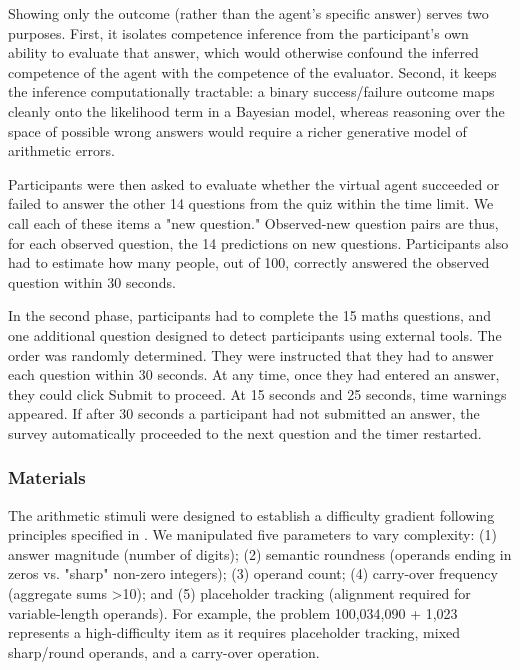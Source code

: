 \documentclass[10pt,letterpaper]{article}
\begin{document}
Showing only the outcome (rather than the agent's specific answer) serves two purposes. First, it isolates competence inference from the participant's own ability to evaluate that answer, which would otherwise confound the inferred competence of the agent with the competence of the evaluator. Second, it keeps the inference computationally tractable: a binary success/failure outcome maps cleanly onto the likelihood term in a Bayesian model, whereas reasoning over the space of possible wrong answers would require a richer generative model of arithmetic errors.

Participants were then asked to evaluate whether the virtual agent succeeded or failed to answer the other 14 questions from the quiz within the time limit. We call each of these items a "new question." Observed-new question pairs are thus, for each observed question, the 14 predictions on new questions. Participants also had to estimate how many people, out of 100, correctly answered the observed question within 30 seconds.

In the second phase, participants had to complete the 15 maths questions, and one additional question designed to detect participants using external tools. The order was randomly determined. They were instructed that they had to answer each question within 30 seconds. At any time, once they had entered an answer, they could click Submit to proceed. At 15 seconds and 25 seconds, time warnings appeared. If after 30 seconds a participant had not submitted an answer, the survey automatically proceeded to the next question and the timer restarted.

\subsubsection{Materials}\label{materials}

The arithmetic stimuli were designed to establish a difficulty gradient following principles specified in \citet{Dehaene-2011}. We manipulated five parameters to vary complexity: (1) answer magnitude (number of digits); (2) semantic roundness (operands ending in zeros vs. "sharp" non-zero integers); (3) operand count; (4) carry-over frequency (aggregate sums >10); and (5) placeholder tracking (alignment required for variable-length operands). For example, the problem 100,034,090 + 1,023 represents a high-difficulty item as it requires placeholder tracking, mixed sharp/round operands, and a carry-over operation.
\end{document}

